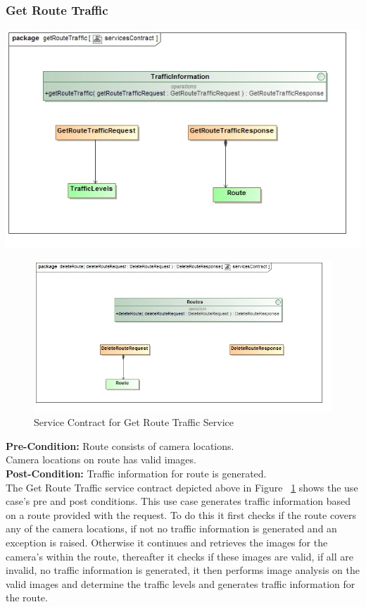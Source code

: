 \documentclass[a4paper,12pt]{article}
\begin{document}
\subsubsection{Get Route Traffic}
\includegraphics[width=\textwidth]{images/scDetermine_Traffic.jpg}
\begin{figure}[here]
\includegraphics[width=\textwidth]{images/scDelete_Route.jpg}
\caption{Service Contract for Get Route Traffic Service}
\label{fig:sc_getroutetraffic}
\end{figure}

\textbf{Pre-Condition: }
Route consists of camera locations.\\
Camera locations on route has valid images.\\
\textbf{Post-Condition: }
Traffic information for route is generated.\\

The Get Route Traffic service contract depicted above in Figure ~\ref{fig:sc_getroutetraffic} shows the use case's pre and post conditions. This use case generates traffic information based on a route provided with the request. To do this it first checks if the route covers any of the camera locations, if not no traffic information is generated and an exception is raised. Otherwise it continues and retrieves the images for the camera's within the route, thereafter it checks if these images are valid, if all are invalid, no traffic information is generated, it then performs image analysis on the valid images and determine the traffic levels and generates traffic information for the route.
\end{document}
